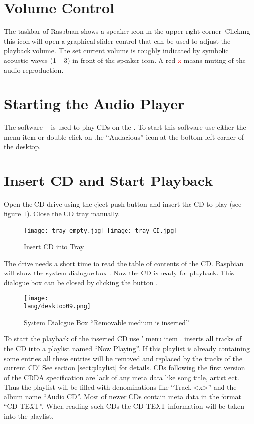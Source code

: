 \section{Volume Control}
The taskbar of Raspbian shows a speaker icon in the upper right corner.
Clicking this icon will open a graphical slider control that can be used
to adjust the playback volume. The set current volume is roughly 
indicated by symbolic acoustic waves (1 -- 3) in front of the speaker 
icon. A red \textcolor{red}{\texttt{x}} means muting of the audio 
reproduction.


\section{Starting the Audio Player \audacious}
The software {\audacious} -- {\audaciousStable} is used to play CDs on 
the {\Bezeichnung}. To start this software use either the menu item
or double-click on the ``Audacious'' icon at the bottom left 
corner of the desktop.


\section{Insert CD and Start Playback}
Open the CD drive using the eject push button and insert the CD to play 
(see figure \ref{fig:insertCD}). Close the CD tray manually.

\begin{figure}[h]
\centering
\texttt{[image: tray\_empty.jpg]}
\texttt{[image: tray\_CD.jpg]}
\caption{Insert CD into Tray}
\label{fig:insertCD}
\end{figure}

The drive needs a short time to read the table of contents of the CD.
Raspbian will show the system dialogue box . Now the CD is ready for playback. This dialogue box can
be closed by clicking the button . 

\begin{figure}[h]
\centering
\texttt{[image: \\lang/desktop09.png]}
\caption{System Dialogue Box ``Removable medium is inserted''}
\label{fig:desktop09}
\end{figure}

To start the playback of the inserted CD use {\audacious}' menu item
. {\audacious} inserts all tracks
of the CD into a playlist named ``Now Playing''. If this playlist is
already containing some entries all these entries will be removed and
replaced by the tracks of the current CD! See section \ref{sect:playlist}
for details. CDs following the first version of the CDDA specification
are lack of any meta data like song title, artist ect. Thus the playlist
will be filled with denominations like ``Track <x>'' and the album name
``Audio CD''. Most of newer CDs contain meta data in the format 
``CD-TEXT''. When reading such CDs the CD-TEXT information will be taken
into the playlist.

